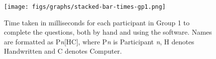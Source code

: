 \documentclass[12pt,twoside,notitlepage,xetex]{report}
\begin{document}
%
\begin{center}
\begin{figure}[H]
\begin{center}
\texttt{[image: figs/graphs/stacked-bar-times-gp1.png]}
\end{center}
\caption{Time taken in milliseconds for each participant in Group 1 to complete the questions, both by hand and using the software.  Names are formatted as P\emph{n}[HC], where P\emph{n} is Participant \emph{n}, H denotes Handwritten and C denotes Computer.}
\label{fig:StacksGp1}
\end{figure}
\end{center}
\end{document}
